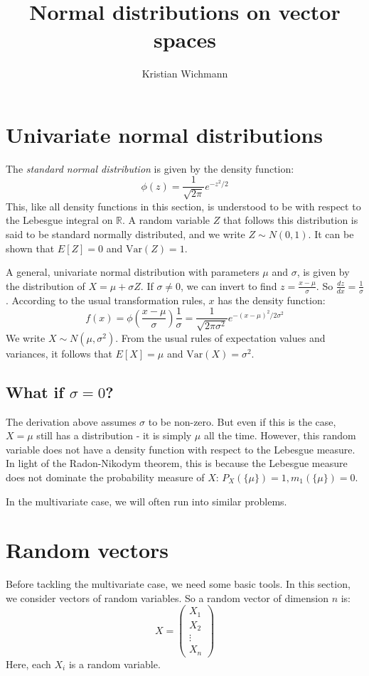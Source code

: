 \documentclass[12pt, a4paper]{article}
\title{Normal distributions on vector spaces}
\author{Kristian Wichmann}
\numberwithin{equation}{section}
\begin{document}
\maketitle

\section{Univariate normal distributions}
The \textit{standard normal distribution} is given by the density function:
\begin{equation}
\label{uni_snd}
\phi(z)=\frac{1}{\sqrt{2\pi}}e^{-z^2/2}
\end{equation}
This, like all density functions in this section, is understood to be with respect to the Lebesgue integral on $\mathbb{R}$. A random variable $Z$ that follows this distribution is said to be standard normally distributed, and we write $Z\sim N(0,1)$. It can be shown that $E[Z]=0$ and $\textrm{Var}(Z)=1$.

A general, univariate normal distribution with parameters $\mu$ and $\sigma$, is given by the distribution of $X=\mu+\sigma Z$. If $\sigma\neq 0$, we can invert to find $z=\frac{x-\mu}{\sigma}$. So $\frac{dz}{dx}=\frac{1}{\sigma}$. According to the usual transformation rules, $x$ has the density function:
\begin{equation}
f(x)=\phi\left(\frac{x-\mu}{\sigma}\right)\frac{1}{\sigma}=\frac{1}{\sqrt{2\pi\sigma^2}}e^{-(x-\mu)^2/2\sigma^2}
\end{equation}
We write $X\sim N(\mu,\sigma^2)$. From the usual rules of expectation values and variances, it follows that $E[X]=\mu$ and $\textrm{Var}(X)=\sigma^2$.

\subsection{What if $\sigma=0$?}
The derivation above assumes $\sigma$ to be non-zero. But even if this is the case, $X=\mu$ still has a distribution - it is simply $\mu$ all the time. However, this random variable does not have a density function with respect to the Lebesgue measure. In light of the Radon-Nikodym theorem, this is because the Lebesgue measure does not dominate the probability measure of $X$: $P_X(\{\mu\})=1, m_1(\{\mu\})=0$.

In the multivariate case, we will often run into similar problems.

\section{Random vectors}
Before tackling the multivariate case, we need some basic tools. In this section, we consider vectors of random variables. So a random vector of dimension $n$ is:
\begin{equation}
X=
\begin{pmatrix}
X_1 \\ X_2 \\ \vdots \\ X_n
\end{pmatrix}
\end{equation}
Here, each $X_i$ is a random variable.
\end{document}
